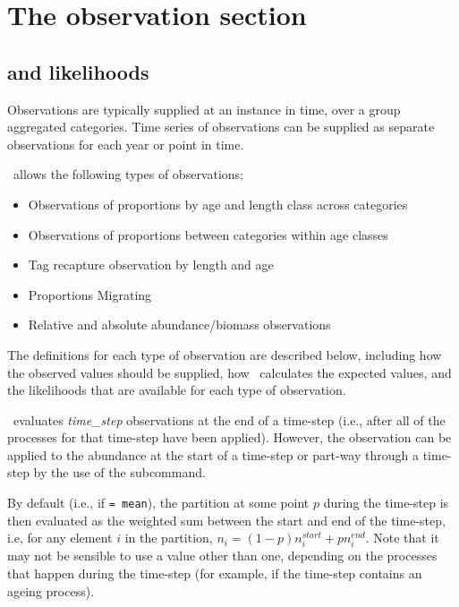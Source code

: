 \section{The observation section\label{sec:observation-section}}

\subsection{ and likelihoods\label{sec:likelihoods}}

Observations are typically supplied at an instance in time, over a group aggregated categories. Time series of observations can be supplied as separate observations for each year or point in time. 

\CNAME\ allows the following types of observations;
\begin{itemize}
  \item Observations of proportions by age and length class across categories
  \item Observations of proportions between categories within age classes
  \item Tag recapture observation by length and age
  \item Proportions Migrating
  \item Relative and absolute abundance/biomass observations
\end{itemize}

The definitions for each type of observation are described below, including how the observed values should be supplied, how \CNAME\ calculates the expected values, and the likelihoods that are available for each type of observation.

\CNAME\ evaluates \textit{time\_step} observations at the end of a time-step (i.e., after all of the processes for that time-step have been applied). However, the observation can be applied to the abundance at the start of a time-step or part-way through a time-step by the use of the  subcommand. 

By default (i.e., if  \texttt{= mean}), the partition at some point $p$ during the time-step is then evaluated as the weighted sum between the start and end of the time-step, i.e, for any element $i$ in the partition, $n_i=(1-p) n_i^{start} + p n_i^{end}$. Note that it may not be sensible to use a value other than one, depending on the processes that happen during the time-step (for example, if the time-step contains an ageing process).

